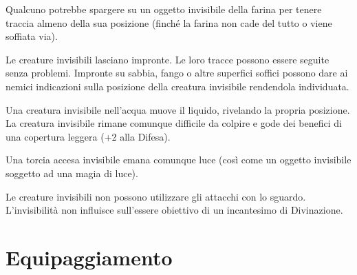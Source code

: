 \documentclass[12pt,a4paper,twoside,openany]{book}
\begin{document}
\begin{multicols}{2}
Qualcuno potrebbe spargere su un oggetto invisibile della farina per tenere traccia almeno della sua posizione (finché la farina non cade del tutto o viene soffiata via).
	
Le creature invisibili lasciano impronte. Le loro tracce possono essere seguite senza problemi. Impronte su sabbia, fango o altre superfici soffici possono dare ai nemici indicazioni sulla posizione della creatura invisibile rendendola individuata.
	
Una creatura invisibile nell'acqua muove il liquido, rivelando la propria posizione. La creatura invisibile rimane comunque difficile da colpire e gode dei benefici di una copertura leggera (+2 alla Difesa).
	
Una torcia accesa invisibile emana comunque luce (così come un oggetto invisibile soggetto ad una magia di luce).
	
Le creature invisibili non possono utilizzare gli attacchi con lo sguardo. L'invisibilità non influisce sull'essere obiettivo di un incantesimo di Divinazione.
	
\end{multicols}

\pagebreak

\section{Equipaggiamento}\hypertarget{equipaggiamento}{}\label{equipaggiamento}
\end{document}
